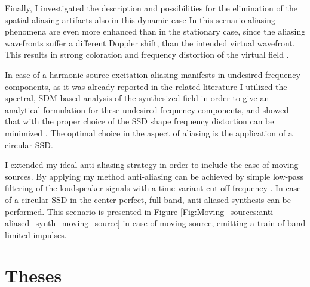 \documentclass[10pt,twoside]{article}
\theoremstyle{thesisgroupstyle}
\theoremstyle{indented}
\begin{document}
Finally, I investigated the description and possibilities for the elimination of the spatial aliasing artifacts also in this dynamic case
In this scenario aliasing phenomena are even more enhanced than in the stationary case, since the aliasing wavefronts suffer a different Doppler shift, than the intended virtual wavefront.
This results in strong coloration and frequency distortion of the virtual field \cite{firtha2016:daga_booklet}.

In case of a harmonic source excitation aliasing manifests in undesired frequency components, as it was already reported in the related literature 
I utilized the spectral, SDM based analysis of the synthesized field in order to give an analytical formulation for these undesired frequency components, and showed that with the proper choice of the SSD shape frequency distortion can be minimized \cite{firtha2016:daga_booklet}.
The optimal choice in the aspect of aliasing is the application of a circular SSD.

I extended my ideal anti-aliasing strategy in order to include the case of moving sources.
By applying my method anti-aliasing can be achieved by simple low-pass filtering of the loudspeaker signals with a time-variant cut-off frequency \cite{Firtha2018_daga_moving_source_booklet}.
In case of a circular SSD in the center perfect, full-band, anti-aliased synthesis can be performed.
This scenario is presented in Figure \ref{Fig:Moving_sources:anti-aliased_synth_moving_source} in case of moving source, emitting a train of band limited impulses.

\clearpage	
\section{Theses}
\label{sec:theses}
\end{document}
